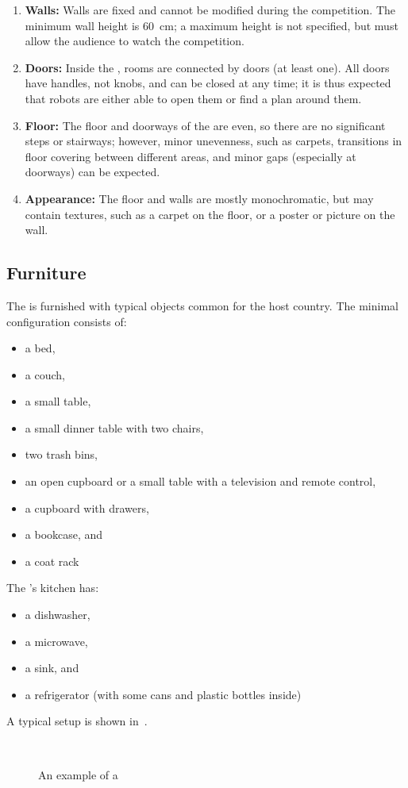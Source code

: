\begin{enumerate}
	\item \textbf{Walls:} Walls are fixed and cannot be modified during the competition. The minimum wall height is \SI{60}{\centi\meter}; a maximum height is not specified, but must allow the audience to watch the competition.
	\item \textbf{Doors:} Inside the \Arena{}, rooms are connected by doors (at least one). All doors have handles, not knobs, and can be closed at any time; it is thus expected that robots are either able to open them or find a plan around them.
	\item \textbf{Floor:} The floor and doorways of the \Arena{} are even, so there are no significant steps or stairways; however, minor unevenness, such as carpets, transitions in floor covering between different areas, and minor gaps (especially at doorways) can be expected.
	\item \textbf{Appearance:} The floor and walls are mostly monochromatic, but may contain textures, such as a carpet on the floor, or a poster or picture on the wall.
\end{enumerate}


\subsection{Furniture}
\label{rule:scenario_furniture}

The \Arena{} is furnished with typical objects common for the host country.
The minimal configuration consists of:
\begin{itemize}
	\item a bed,
	\item a couch,
	\item a small table,
	\item a small dinner table with two chairs,
	\item two trash bins,
	\item an open cupboard or a small table with a television and remote control,
	\item a cupboard with drawers,
	\item a bookcase, and
	\item a coat rack
\end{itemize}
The \Arena{}'s kitchen has:
\begin{itemize}
	\item a dishwasher,
	\item a microwave,
	\item a sink, and
	\item a refrigerator (with some cans and plastic bottles inside)
\end{itemize}
A typical \Arena{} setup is shown in~.
\begin{figure}[tbp]
	\centering
	 ~
	\caption{An example of a \RoboCup\AtHome \Arena}
	\label{fig:arena}
\end{figure}

